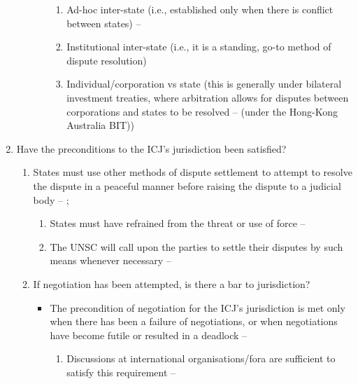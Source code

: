 \begin{enumerate}
\begin{enumerate}
\begin{enumerate}
            \begin{enumerate}
                \item Ad-hoc inter-state (i.e., established only when there is conflict between states) -- 
                \item Institutional inter-state (i.e., it is a standing, go-to method of dispute resolution)
                \item Individual/corporation vs state (this is generally under bilateral investment treaties, where arbitration allows for disputes between corporations and states to be resolved --  (under the Hong-Kong Australia BIT))
            \end{enumerate}
        \end{enumerate}
    \end{enumerate}
    \item Have the preconditions to the ICJ's jurisdiction been satisfied?
    \begin{enumerate}
        \item States must use other methods of dispute settlement to attempt to resolve the dispute in a peaceful manner before raising the dispute to a judicial body -- ; 
        \begin{enumerate}
            \item States must have refrained from the threat or use of force -- 
            \item The UNSC will call upon the parties to settle their disputes by such means whenever necessary -- 
        \end{enumerate}
        \item If negotiation has been attempted, is there a bar to jurisdiction?
        \begin{itemize}
            \item The precondition of negotiation for the ICJ's jurisdiction is met only when there has been a failure of negotiations, or when negotiations have become futile or resulted in a deadlock -- 
            \begin{enumerate}
                \item Discussions at international organisations/fora are sufficient to satisfy this requirement -- 

\end{enumerate}
\end{itemize}
\end{enumerate}
\end{enumerate}
